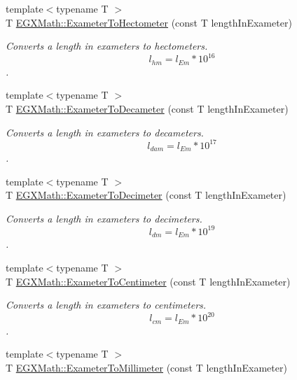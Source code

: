 \begin{DoxyCompactItemize}
{\footnotesize template$<$typename T $>$ }\\T \mbox{\hyperlink{group___e_g_x_math-_conversions-_length_conversions-_s_i-_exameter-_s_i_gaa8f58d36da35b834499715694c75ce99}{E\+G\+X\+Math\+::\+Exameter\+To\+Hectometer}} (const T length\+In\+Exameter)
\begin{DoxyCompactList}\small\item\em Converts a length in exameters to hectometers. \[ l_{hm}=l_{Em} * 10^{16} \]. \end{DoxyCompactList}\item 
{\footnotesize template$<$typename T $>$ }\\T \mbox{\hyperlink{group___e_g_x_math-_conversions-_length_conversions-_s_i-_exameter-_s_i_ga06159c597dfa489a8981c261622bf574}{E\+G\+X\+Math\+::\+Exameter\+To\+Decameter}} (const T length\+In\+Exameter)
\begin{DoxyCompactList}\small\item\em Converts a length in exameters to decameters. \[ l_{dam}=l_{Em} * 10^{17} \]. \end{DoxyCompactList}\item 
{\footnotesize template$<$typename T $>$ }\\T \mbox{\hyperlink{group___e_g_x_math-_conversions-_length_conversions-_s_i-_exameter-_s_i_ga6d2909e8189cfc7b07d846a34f277afb}{E\+G\+X\+Math\+::\+Exameter\+To\+Decimeter}} (const T length\+In\+Exameter)
\begin{DoxyCompactList}\small\item\em Converts a length in exameters to decimeters. \[ l_{dm}=l_{Em} * 10^{19} \]. \end{DoxyCompactList}\item 
{\footnotesize template$<$typename T $>$ }\\T \mbox{\hyperlink{group___e_g_x_math-_conversions-_length_conversions-_s_i-_exameter-_s_i_ga6f379e6cd3c3523fb3ff16eadcbefba9}{E\+G\+X\+Math\+::\+Exameter\+To\+Centimeter}} (const T length\+In\+Exameter)
\begin{DoxyCompactList}\small\item\em Converts a length in exameters to centimeters. \[ l_{cm}=l_{Em} * 10^{20} \]. \end{DoxyCompactList}\item 
{\footnotesize template$<$typename T $>$ }\\T \mbox{\hyperlink{group___e_g_x_math-_conversions-_length_conversions-_s_i-_exameter-_s_i_ga71baa21a517793479c9bbb9e1a5c713b}{E\+G\+X\+Math\+::\+Exameter\+To\+Millimeter}} (const T length\+In\+Exameter)

\end{DoxyCompactItemize}
